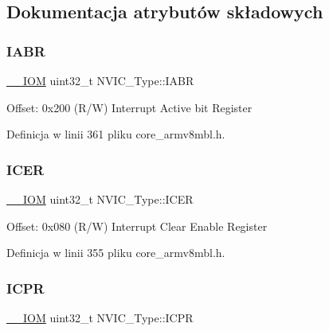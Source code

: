\subsection{Dokumentacja atrybutów składowych}
\mbox{\label{struct_n_v_i_c___type_a6e42ca3d9a1e12e75463cef68785d533}} 
\subsubsection{\texorpdfstring{I\+A\+BR}{IABR}}
{\footnotesize\ttfamily \hyperlink{core__sc300_8h_ab6caba5853a60a17e8e04499b52bf691}{\+\_\+\+\_\+\+I\+OM} uint32\+\_\+t N\+V\+I\+C\+\_\+\+Type\+::\+I\+A\+BR}

Offset\+: 0x200 (R/W) Interrupt Active bit Register 

Definicja w linii 361 pliku core\+\_\+armv8mbl.\+h.

\mbox{\label{struct_n_v_i_c___type_aed882e10ea8ee6a915007af71643d7da}} 
\subsubsection{\texorpdfstring{I\+C\+ER}{ICER}}
{\footnotesize\ttfamily \hyperlink{core__sc300_8h_ab6caba5853a60a17e8e04499b52bf691}{\+\_\+\+\_\+\+I\+OM} uint32\+\_\+t N\+V\+I\+C\+\_\+\+Type\+::\+I\+C\+ER}

Offset\+: 0x080 (R/W) Interrupt Clear Enable Register 

Definicja w linii 355 pliku core\+\_\+armv8mbl.\+h.

\mbox{\label{struct_n_v_i_c___type_aa056e3f59e88845ee47db4a43635b3a2}} 
\subsubsection{\texorpdfstring{I\+C\+PR}{ICPR}}
{\footnotesize\ttfamily \hyperlink{core__sc300_8h_ab6caba5853a60a17e8e04499b52bf691}{\+\_\+\+\_\+\+I\+OM} uint32\+\_\+t N\+V\+I\+C\+\_\+\+Type\+::\+I\+C\+PR}

